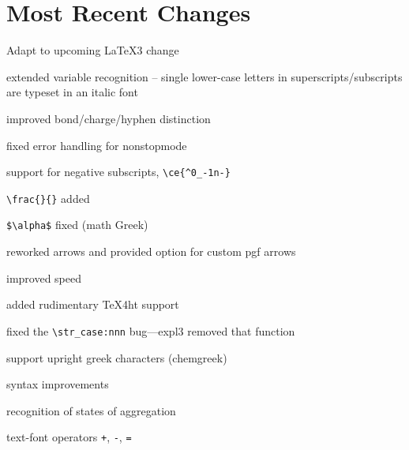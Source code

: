 \documentclass[a4paper,notitlepage,parskip=half]{scrreprt}
\begin{document}
\section{Most Recent Changes}%

\begin{compactitem}
\item Adapt to upcoming \LaTeX3 change
\end{compactitem}

\begin{compactitem}
\item extended variable recognition -- single lower-case letters in superscripts/subscripts are typeset in an italic font
\item improved bond/charge/hyphen distinction 
\item fixed error handling for nonstopmode
\end{compactitem}

\begin{compactitem}
\item support for negative subscripts, \verb|\ce{^0_-1n-}|
\item \verb|\frac{}{}| added
\item \verb|$\alpha$| fixed (math Greek)
\end{compactitem}

\begin{compactitem}
\item reworked arrows and provided option for custom pgf arrows
\item improved speed
\end{compactitem}

\begin{compactitem}
\item added rudimentary TeX4ht support
\item fixed the \verb|\str_case:nnn| bug---expl3 removed that function
\end{compactitem}

\begin{compactitem}
\item support upright greek characters (chemgreek)
\item syntax improvements%
\item recognition of states of aggregation%
\item text-font operators \verb|+|, \verb|-|, \verb|=|
\end{compactitem}
\end{document}
